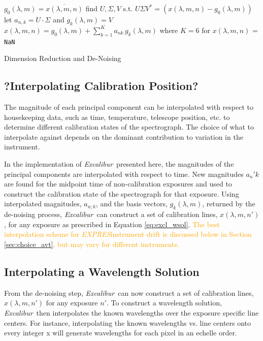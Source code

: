 \documentclass[modern]{aastex63}
\newcommand{\project}[1]{\textsl{#1}}
\newcommand{\name}{\project{Excalibur}}
\newcommand{\acronym}[1]{{\small{#1}}}
\newcommand{\expres}{\project{\acronym{EXPRES}}}
\newcommand{\code}[1]{\texttt{#1}}
\newcommand{\lz}[1]{\textcolor{orange}{#1}}
\begin{document}
\begin{algorithm}
\SetAlgoLined
{}
{
	$g_0(\lambda,m) = \overline{x(\lambda,m,n)}$\;
	find $U, \Sigma, V$ s.t. $U\Sigma V^* = (x(\lambda,m,n)-g_0(\lambda,m))$\;
	let $a_{n,k} = U\cdot \Sigma$ and $g_k(\lambda,m) = V$\;
	$x(\lambda,m,n) = g_0(\lambda,m) + \sum_{k=1}^K a_{nk}\,g_k(\lambda,m)$ where $K=6$ for $x(\lambda,m,n)$ = \code{NaN}
	}
\caption{Dimension Reduction and De-Noising}
\end{algorithm}

\subsection{?Interpolating Calibration Position?}
 \label{sec:interp_time}
The magnitude of each principal component can be interpolated with respect to housekeeping data, such as time, temperature, telescope position, etc. to determine different calibration states of the spectrograph.  The choice of what to interpolate against depends on the dominant contribution to variation in the instrument.

In the implementation of \name\ presented here, the magnitudes of the principal components are interpolated with respect to time.  New magnitudes $a_n'k$ are found for the midpoint time of non-calibration exposures and used to construct the calibration state of the spectrograph for that exposure.  Using interpolated magnitudes, $a_{n;k}$, and the basis vectors, $g_k(\lambda,m)$, returned by the de-noising process, \name\ can construct a set of calibration lines, $x(\lambda,m,n') $, for any exposure as prescribed in Equation \ref{eq:excl_wsol}.  \lz{The best interpolation scheme for \expres\' instrument drift is discussed below in Section \ref{sec:choice_avt}, but may vary for different instruments.}


\subsection{Interpolating a Wavelength Solution} \label{sec:interp_wsol}
From the de-noising step, \name\ can now construct a set of calibration lines, $x(\lambda,m,n')$ for any exposure $n'$.  To construct a wavelength solution, \name\ then interpolates the known wavelengths over the exposure specific line centers.  For instance, interpolating the known wavelengths vs. line centers onto every integer x will generate wavelengths for each pixel in an echelle order.
\end{document}
